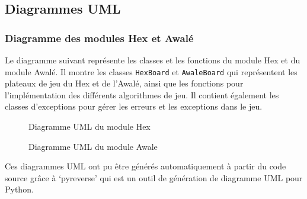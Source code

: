 \subsection{Diagrammes UML}

\subsubsection{Diagramme des modules Hex et Awalé}

Le diagramme suivant représente les classes et les fonctions du module Hex et du module Awalé.
Il montre les classes \texttt{HexBoard} et \texttt{AwaleBoard} qui représentent les plateaux de jeu
du Hex et de l'Awalé, ainsi que les fonctions pour l'implémentation des différents algorithmes de jeu.
Il contient également les classes d'exceptions pour gérer les erreurs et les exceptions dans le jeu.

\begin{figure}[!htb]
    \centering
    \caption{Diagramme UML du module Hex}\label{Fig:UML_hex}
\end{figure}
\begin{figure}[!htb]
    \centering
    \caption{Diagramme UML du module Awale}\label{Fig:UML_awale}
\end{figure}

Ces diagrammes UML ont pu être générés automatiquement à partir du code source grâce à 
`pyreverse' qui est un outil de génération de diagramme UML pour Python.

